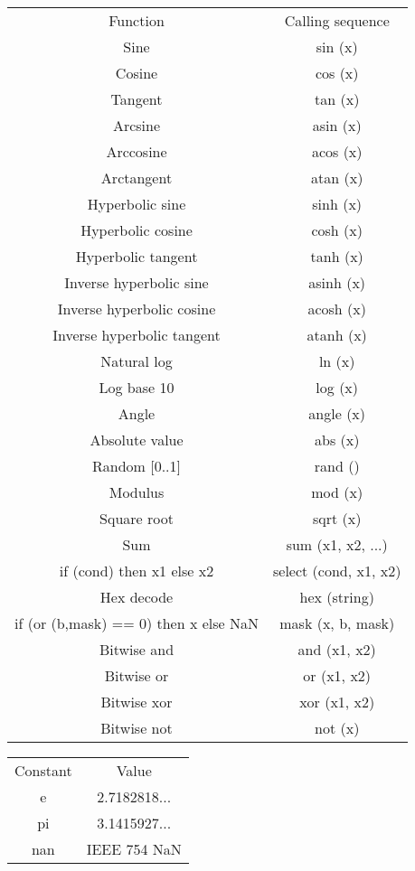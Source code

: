 \begin{tabular}{|c|c|}
\hline 
 & \\
 \hline 
Function &Calling sequence \\
 \hline 
Sine &sin (x) \\
 \hline 
Cosine &cos (x) \\
 \hline 
Tangent &tan (x) \\
 \hline 
Arcsine &asin (x) \\
 \hline 
Arccosine &acos (x) \\
 \hline 
Arctangent &atan (x) \\
 \hline 
Hyperbolic sine &sinh (x) \\
 \hline 
Hyperbolic cosine &cosh (x) \\
 \hline 
Hyperbolic tangent &tanh (x) \\
 \hline 
Inverse hyperbolic sine &asinh (x) \\
 \hline 
Inverse hyperbolic cosine &acosh (x) \\
 \hline 
Inverse hyperbolic tangent &atanh (x) \\
 \hline 
Natural log &ln (x) \\
 \hline 
Log base 10 &log (x) \\
 \hline 
Angle &angle (x) \\
 \hline 
Absolute value &abs (x) \\
 \hline 
Random [0..1] &rand () \\
 \hline 
Modulus &mod (x) \\
 \hline 
Square root &sqrt (x) \\
 \hline 
Sum &sum (x1, x2, ...) \\
 \hline 
if (cond) then x1 else x2 &select (cond, x1, x2) \\
 \hline 
Hex decode &hex (string) \\
 \hline 
if (or (b,mask) == 0) then x else NaN &mask (x, b, mask) \\
 \hline 
Bitwise and &and (x1, x2) \\
 \hline 
Bitwise or &or (x1, x2) \\
 \hline 
Bitwise xor &xor (x1, x2) \\
 \hline 
Bitwise not &not (x) \\
 \hline 

\end{tabular}



\begin{tabular}{|c|c|}
\hline 
 & \\
 \hline 
Constant &Value \\
 \hline 
e &2.7182818... \\
 \hline 
pi &3.1415927... \\
 \hline 
nan &IEEE 754 NaN \\
 \hline 

\end{tabular}



